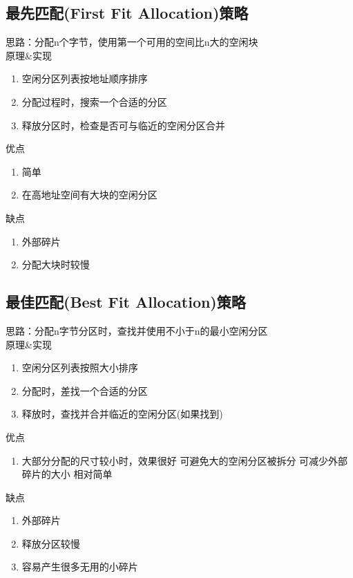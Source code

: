 \subsection{最先匹配(First Fit Allocation)策略}
思路：分配n个字节，使用第一个可用的空间比n大的空闲块\\
原理\&实现
\begin{enumerate}
	\item 空闲分区列表按地址顺序排序
	\item 分配过程时，搜索一个合适的分区
	\item 释放分区时，检查是否可与临近的空闲分区合并
\end{enumerate}
优点
\begin{enumerate}
	\item 简单
	\item 在高地址空间有大块的空闲分区
\end{enumerate}
缺点
\begin{enumerate}
	\item 外部碎片
	\item 分配大块时较慢
\end{enumerate}
\subsection{最佳匹配(Best Fit Allocation)策略}
思路：分配n字节分区时，查找并使用不小于n的最小空闲分区\\
原理\&实现
\begin{enumerate}
	\item 空闲分区列表按照大小排序
	\item 分配时，差找一个合适的分区
	\item 释放时，查找并合并临近的空闲分区(如果找到)
\end{enumerate}
优点
\begin{enumerate}
	\item 大部分分配的尺寸较小时，效果很好
	\subitem 可避免大的空闲分区被拆分
	\subitem 可减少外部碎片的大小
	\subitem 相对简单
\end{enumerate}
缺点
\begin{enumerate}
	\item 外部碎片
	\item 释放分区较慢
	\item 容易产生很多无用的小碎片
\end{enumerate}
